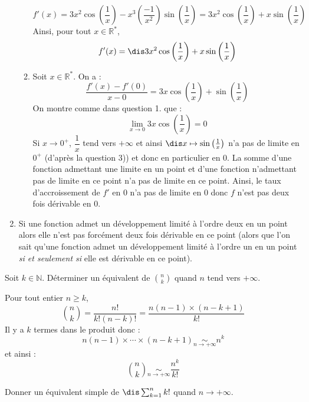 \documentclass[a4paper,10pt]{report}
\begin{document}
\begin{enumerate}
\begin{enumerate}
$$ f'(x) = 3x^2 \cos \left( \frac{1}{x} \right) - x^3 \left( \frac{-1}{x^2} \right)  \sin \left( \frac{1}{x} \right) = 3x^2 \cos \left( \frac{1}{x} \right) + x  \sin \left( \frac{1}{x} \right)$$
Ainsi, pour tout $x \in \mathbb{R}^*$, 
$$f'(x) = \dis 3x^2 \cos \left( \frac{1}{x} \right) + x  \sin \left( \frac{1}{x} \right)$$
\item Soit $x \in \mathbb{R}^*$. On a :
$$ \frac{f'(x)-f'(0)}{x-0} = 3x \cos \left( \frac{1}{x} \right) +   \sin \left( \frac{1}{x} \right)$$
On montre comme dans question 1. que :
$$ \lim_{x \rightarrow 0} 3x \cos \left( \frac{1}{x} \right) = 0$$
Si $x \rightarrow 0^+$, $\dfrac{1}{x}$ tend vers $+ \infty$ et ainsi $\dis x \mapsto \sin \left( \frac{1}{x} \right)$ n'a pas de limite en $0^+$ (d'après la question 3)) et donc en particulier en $0$. La somme d'une fonction admettant une limite en un point et d'une fonction n'admettant pas de limite en ce point n'a pas de limite en ce point. Ainsi, le taux d'accroissement de $f'$ en $0$ n'a pas de limite en $0$ donc $f$ n'est pas deux fois dérivable en $0$.
\end{enumerate}
\item Si une fonction admet un développement limité à l'ordre deux en un point alors elle n'est pas forcément deux fois dérivable en ce point (alors que l'on sait qu'une fonction admet un développement limité à l'ordre un en un point \textit{si et seulement si} elle est dérivable en ce point).
\end{enumerate}

\begin{Exa} Soit $k \in \mathbb{N}$. Déterminer un équivalent de $\binom{n}{k}$ quand $n$ tend vers $+ \infty$. 
\end{Exa}

\corr Pour tout entier $n \geq k$,
$$ \binom{n}{k} = \dfrac{n!}{k!(n-k)!} = \dfrac{n(n-1)\times (n-k+1)}{k!}$$
Il y a $k$ termes dans le produit donc :
$$ n(n-1)\times \cdots \times (n-k+1) \underset{n \rightarrow + \infty}{\sim} n^k$$
et ainsi :
$$  \binom{n}{k} \underset{n \rightarrow+ \infty}{\sim} \dfrac{n^k}{k!}$$

\begin{Exa} Donner un équivalent simple de $\dis \sum_{k=1}^n k!$ quand $n \rightarrow + \infty$.
\end{Exa} 
\end{document}
